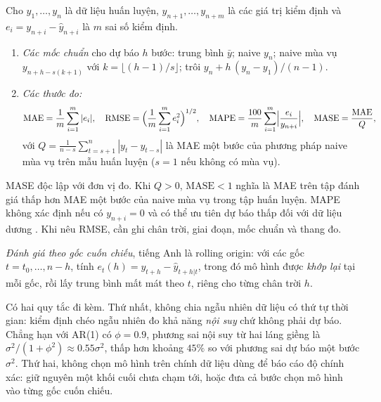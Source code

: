 Cho $y_1,\dots,y_n$ là dữ liệu huấn luyện, $y_{n+1},\dots,y_{n+m}$ là các giá trị kiểm định và $e_i=y_{n+i}-\hat y_{n+i}$ là $m$ sai số kiểm định.
\begin{kq}
\begin{enumerate}[label=(\roman*),leftmargin=*,itemsep=1pt]
\item \emph{Các mốc chuẩn} cho dự báo $h$ bước: trung bình $\bar y$; naive $y_n$; naive mùa vụ $y_{n+h-s(k+1)}$ với $k=\lfloor(h-1)/s\rfloor$; trôi $y_n+h\,(y_n-y_1)/(n-1)$.
\item \emph{Các thước đo:}
\[
\mathrm{MAE}=\frac1m\sum_{i=1}^{m}|e_i|,\quad
\mathrm{RMSE}=\Bigl(\frac1m\sum_{i=1}^{m}e_i^2\Bigr)^{1/2},\quad
\mathrm{MAPE}=\frac{100}{m}\sum_{i=1}^{m}\Bigl|\frac{e_i}{y_{n+i}}\Bigr|,\quad
\mathrm{MASE}=\frac{\mathrm{MAE}}{Q},
\]
với $Q=\frac1{n-s}\sum_{t=s+1}^{n}|y_t-y_{t-s}|$ là MAE một bước của phương pháp naive mùa vụ trên mẫu huấn luyện ($s=1$ nếu không có mùa vụ).
\end{enumerate}
\end{kq}
MASE độc lập với đơn vị đo. Khi $Q>0$, $\mathrm{MASE}<1$ nghĩa là MAE trên tập đánh giá thấp hơn MAE một bước của naive mùa vụ trong tập huấn luyện. MAPE không xác định nếu có $y_{n+i}=0$ và có thể ưu tiên dự báo thấp đối với dữ liệu dương . Khi nêu RMSE, cần ghi chân trời, giai đoạn, mốc chuẩn và thang đo.

\begin{kq}
\emph{Đánh giá theo gốc cuốn chiếu}, tiếng Anh là rolling origin: với các gốc $t=t_0,\dots,n-h$, tính $e_t(h)=y_{t+h}-\hat y_{t+h|t}$, trong đó mô hình được \emph{khớp lại} tại mỗi gốc, rồi lấy trung bình mất mát theo $t$, riêng cho từng chân trời $h$.
\end{kq}
Có hai quy tắc đi kèm. Thứ nhất, không chia ngẫu nhiên dữ liệu có thứ tự thời gian: kiểm định chéo ngẫu nhiên đo khả năng \emph{nội suy} chứ không phải dự báo. Chẳng hạn với AR(1) có $\phi=0.9$, phương sai nội suy từ hai láng giềng là $\sigma^2/(1+\phi^2)\approx0.55\sigma^2$, thấp hơn khoảng $45\%$ so với phương sai dự báo một bước $\sigma^2$. Thứ hai, không chọn mô hình trên chính dữ liệu dùng để báo cáo độ chính xác: giữ nguyên một khối cuối chưa chạm tới, hoặc đưa cả bước chọn mô hình vào từng gốc cuốn chiếu.

